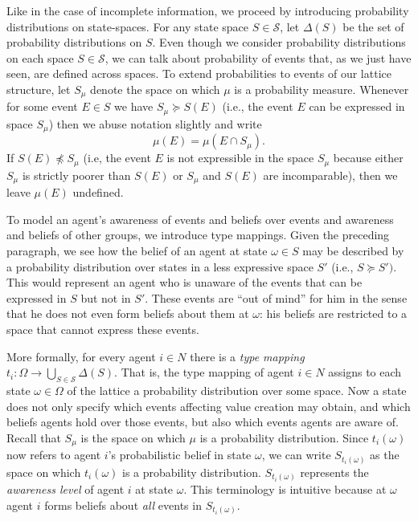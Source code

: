 \documentclass[
11pt,
titlepage,
reqno,
]{article}%
\theoremstyle{definition}
\begin{document}
Like in the case of incomplete information, we proceed by introducing probability distributions on state-spaces. For any state space $S \in \mathcal{S}$, let $\Delta(S)$ be the set of probability distributions on $S$. Even though we consider probability distributions on each space $S \in \mathcal{S}$, we can talk about probability of events that, as we just have seen, are defined across spaces. To extend probabilities to events of our lattice structure, let $S_{\mu}$ denote the space on which $\mu$ is a probability measure. Whenever for some event $E \in S$ we have $S_{\mu} \succeq S(E)$ (i.e., the event $E$ can be expressed in space $S_{\mu}$) then we abuse notation slightly and write
\begin{equation*}
\mu \left( E \right) = \mu \left( E\cap S_{\mu}\right).
\end{equation*}
If $S(E) \npreceq S_{\mu}$ (i.e, the event $E$ is not expressible in the space $S_{\mu}$ because either $S_{\mu}$ is strictly poorer than $S(E)$ or $S_{\mu}$ and $S(E)$ are incomparable), then we leave $\mu(E)$ undefined.

To model an agent's awareness of events and beliefs over events and awareness and beliefs of other groups, we introduce type mappings. Given the preceding paragraph, we see how the belief of an agent at state $\omega \in S$ may be described by a probability distribution over states in a less expressive space $S'$ (i.e., $S \succeq S')$. This would represent an agent who is unaware of the events that can be expressed in $S$ but not in $S'$. These events are ``out of mind'' for him in the sense that he does not even form beliefs about them at $\omega$:  his beliefs are restricted to a space that cannot express these events.

More formally, for every agent $i \in N$ there is a \textit{type mapping} $t_{i}: \Omega \longrightarrow \bigcup_{S \in \mathcal{S}} \Delta(S)$. That is, the type mapping of agent $i \in N$ assigns to each state $\omega \in \Omega$ of the lattice a probability distribution over some space. Now a state does not only specify which events affecting value creation may obtain, and which beliefs agents hold over those events, but also which events agents are aware of. Recall that $S_{\mu}$ is the space on which $\mu$ is a probability distribution. Since $t_i(\omega)$ now refers to agent $i$'s probabilistic belief in state $\omega$, we can write $S_{t_i(\omega)}$ as the space on which $t_i(\omega)$ is a probability distribution. $S_{t_i(\omega)}$ represents the \emph{awareness level} of agent $i$ at state $\omega$. This terminology is intuitive because at $\omega$ agent $i$ forms beliefs about \textit{all} events in $S_{t_i(\omega)}$.
\end{document}
